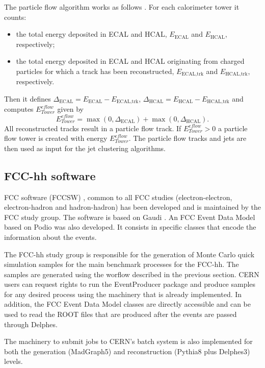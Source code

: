 The particle flow algorithm works as follows \cite{Delphes}. For each calorimeter tower it counts:
\begin{itemize}
	\item the total energy deposited in ECAL and HCAL, $E_{\text{ECAL}}$ and $E_{\text{HCAL}}$, respectively;
	\item the total energy deposited in ECAL and HCAL originating from charged particles for which a track has been reconstructed, $E_{\text{ECAL,trk}}$ and $E_{\text{HCAL,trk}}$, respectively.
\end{itemize}
Then it defines $\Delta_{\text{ECAL}}=E_{\text{ECAL}}-E_{\text{ECAL,trk}}$, $\Delta_{\text{HCAL}}=E_{\text{HCAL}}-E_{\text{HCAL,trk}}$ and computes $E^{eflow}_{Tower}$ given by
\begin{equation}
	E^{eflow}_{Tower}=\max(0,\Delta_{\text{ECAL}})+\max(0,\Delta_{\text{HCAL}}).
\end{equation}
All reconstructed tracks result in a particle flow track. If $E^{eflow}_{Tower}>0$ a particle flow tower is created with energy $E^{eflow}_{Tower}$. The particle flow tracks and jets are then used as input for the jet clustering algorithms.

\subsection{FCC-hh software}
\label{subsec:FCC_software}

FCC software (FCCSW) \cite{FCCSW}, common to all FCC studies (electron-electron, electron-hadron and hadron-hadron) has been developed and is maintained by the FCC study group. The software is based on Gaudi \cite{gaudi}. An FCC Event Data Model based on Podio \cite{Podio} was also developed. It consists in specific classes that encode the information about the events.

The FCC-hh study group is responsible for the generation of Monte Carlo quick simulation samples for the main benchmark processes for the FCC-hh. The samples are generated using the worflow described in the previous section. CERN users can request rights to run the EventProducer package \cite{FCCEventProducer} and produce samples for any desired process using the machinery that is already implemented. In addition, the FCC Event Data Model classes are directly accessible and can be used to read the ROOT files that are produced after the events are passed through Delphes.

The machinery to submit jobs to CERN's batch system is also implemented for both the generation (MadGraph5) and reconstruction (Pythia8 plus Delphes3) levels.

